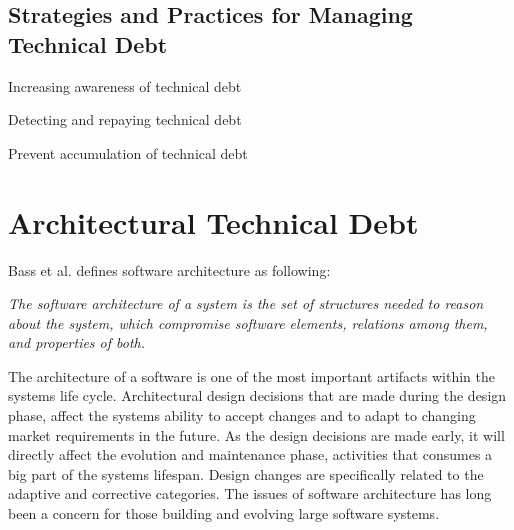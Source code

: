 \subsection{Strategies and Practices for Managing Technical Debt}

Increasing awareness of technical debt

Detecting and repaying technical debt

Prevent accumulation of technical debt

























\section{Architectural Technical Debt}
Bass et al.\cite{Bass:2012:SAP:2392670} defines software architecture as following: 

\begin{displayquote}
\textit{The software architecture of a system is the set of structures needed to reason about the system, which compromise software elements, relations among them, and properties of both.}
\end{displayquote}

The architecture of a software is one of the most important artifacts within the systems life cycle\cite{Bass:2012:SAP:2392670,knodel2006static}. Architectural design decisions that are made during the design phase, affect the systems ability to accept changes and to adapt to changing market requirements in the future. As the design decisions are made early, it will directly affect the evolution and maintenance phase\cite{Pressman:2009:SEP:1593949}, activities that consumes a big part of the systems lifespan\cite{Vliet:2008:SEP:1481475}. Design changes are specifically related to the adaptive and corrective categories. The issues of software architecture has long been a concern for those building and evolving large software systems\cite{perry1997state}.




